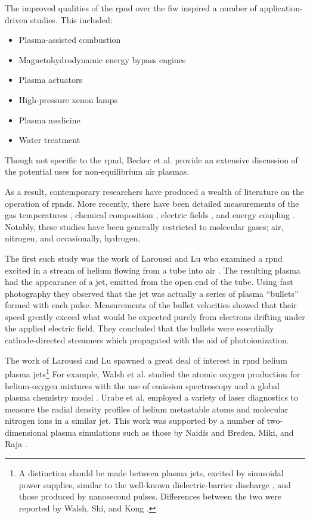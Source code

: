 The improved qualities of the \acs{rpnd} over the \acs{fiw} inspired a number of
application-driven studies. This included:
\begin{itemize}
  \item Plasma-assisted combustion \cite{Pancheshnyi2006, Starikovskaia2006, 
        Adamovich2008}
  \item Magnetohydrodynamic energy bypass engines \cite{Macheret2002,
        Adamovich2008, Schneider2009a}
  \item Plasma actuators \cite{Starikovskii2009, Adamovich2009}
  \item High-pressure xenon lamps \cite{Nikandrov2008}
  \item Plasma medicine \cite{Ayan2009, Zimmerman2012}
  \item Water treatment \cite{Foster2013}
\end{itemize}
Though not specific to the \acs{rpnd}, Becker et al. \cite{Becker2005} provide
an extensive discussion of the potential uses for non-equilibrium air plasmas.

As a result, contemporary researchers have produced a wealth of literature on
the operation of \acs{rpnd}s. More recently, there have been detailed
measurements of the gas temperatures \cite{Pilla2006, Pancheshnyi2006,
Nishihara2006, Bao2007, Lou2007, Pai2009, Zuzeek2010, Nishihara2011}, chemical
composition \cite{Bao2007, Lou2007, Pai2009}, electric fields \cite{Ito2009,
Ito2010, Muller2011a}, and energy coupling \cite{Macheret2006, Pancheshnyi2006}.
Notably, these studies have been generally restricted to molecular gases; air,
nitrogen, and occasionally, hydrogen.

The first such study was the work of Laroussi and Lu who examined a
\acs{rpnd} excited in a stream of helium flowing from a tube into air
\cite{Laroussi2005, Lu2006}. The resulting plasma had the appearance of a jet,
emitted from the open end of the tube. Using fast photography they observed that
the jet was actually a series of plasma ``bullets'' formed with each pulse.
Measurements of the bullet velocities showed that their speed greatly exceed
what would be expected purely from electrons drifting under the applied electric
field. They concluded that the bullets were essentially cathode-directed
streamers which propagated with the aid of photoionization.

The work of Laroussi and Lu spawned a great deal of interest in \acs{rpnd}
helium plasma jets\footnote{A distinction should be made between plasma jets,
excited by sinusoidal power supplies, similar to the well-known
dielectric-barrier discharge \cite{Kogelschatz2003}, and those produced by
nanosecond pulses. Differences between the two were reported by Walsh, Shi, and
Kong \cite{Walsh2006}.} For example, Walsh et al. studied the atomic oxygen
production for helium-oxygen mixtures with the use of emission spectroscopy and
a global plasma chemistry model \cite{Walsh2010}. Urabe et al. employed a
variety of laser diagnostics to measure the radial density profiles of helium
metastable atoms and molecular nitrogen ions in a similar jet. This work was
supported by a number of two-dimensional plasma simulations such as those by
Naidis \cite{Naidis2010} and Breden, Miki, and Raja \cite{Breden2011}.

